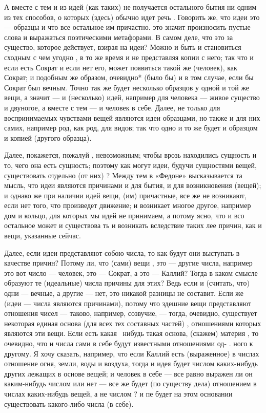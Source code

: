 \documentclass{article}
\begin{document}
А вместе с тем и из идей (как таких)  не получается остального бытия ни одним из тех способов,
\footnotemark[15]
о которых (здесь) обычно идет речь . Говорить же, что идеи это --- образцы и что все остальное им причастно. это значит произносить пустые слова и выражаться поэтическими метафорами. В самом деле, что это за существо, которое действует, взирая на идеи? Можно и быть и становиться сходным с чем угодно , в то же время и не представляя копии с него; так что и если есть Сократ и если нет его, может появиться такой же (человек), как Сократ; и подобным же образом, очевидно* (было бы) и в том случае, если бы Сократ был вечным. Точно так же будет несколько образцов у одной и той же вещи, а значит --- и (несколько) идей, например для человека --- живое существо и двуногое, а вместе с тем --- и человек в себе. Далее, не только для воспринимаемых чувствами вещей являются идеи образцами, но также и для них самих, например род, как род, для видов; так что одно и то же будет и образцом и копией (другого образца).

Далее, покажется, пожалуй , невозможным; чтобы врозь находились сущность и то, чего она есть сущность; поэтому как могут идеи, будучи сущностями вещей, существовать отдельно (от них) ? Между тем в «Федоне»
\footnotemark[16]
высказывается та мысль, что идеи являются причинами и для бытия, и для возникновения (вещей); и однако же при наличии идей вещи, (им) причастные, все же не возникают, если нет того, что произведет движение; и возникает многое другое, например дом и кольцо, для которых мы идей не принимаем,
\footnotemark[17]
а потому ясно, что и всо остальное может и существова ть и возникать вследствие таких лее причин, как и вещи, указанные сейчас.
\footnotemark[18]


Далее, если идеи представляют собою числа, то как будут они выступать в качестве причин? Потому ли, что (сами) вещи , это --- другие числа, например это вот число --- человек, это --- Сократ, а это --- Каллий? Тогда в каком смысле образуют те (идеальные) числа причины для этих? Ведь если и (считать, что) одни --- вечные, а другие --- нет, это никакой разницы не составит. Если же (идеи --- числа являются причинами), потому что здешние вещи представляют отношения чисел --- таково, например, созвучие, --- тогда, очевидно, существует некоторая единая основа (для всех тех составных частей)  , отношениями которых являются эти вещи. Если есть какая~ нибудь такая основа, (скажем) материя , то очевидно, что и числа сами в себе  будут известными отношениями од- . ного к другому. Я хочу сказать, например, что если Каллий есть (выраженное) в числах отношение огня, земли, воды и воздуха, тогда и идея будет числом каких-нибудь других лежащих в основе вещей;
\footnotemark[20]
и человек в себе --- все равно выражен ли он каким-нибудь числом или нет --- все же будет (по существу дела) отношением в числах каких-нибудь вещей, а не числом  ? и пе будет на этом основании существовать какого-либо числа (в себе).
\footnotemark[19]
\end{document}
